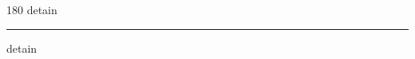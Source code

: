 
\begin{frame}
\begin{center}
\begin{turn}{180}
{\fontsize{2.5cm}{1em}\selectfont detain}
\end{turn}
\vspace{1em}\par  
\hrule
\vspace{1em}\par  
{\fontsize{2.5cm}{1em}\selectfont detain}
\end{center}
\end{frame}
